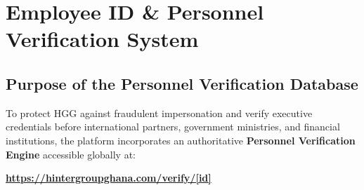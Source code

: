 \documentclass[11pt,a4paper,oneside]{book}
\begin{document}
\chapter{Employee ID \& Personnel Verification System}
\label{chap:verification}

\section{Purpose of the Personnel Verification Database}
To protect HGG against fraudulent impersonation and verify executive credentials before international partners, government ministries, and financial institutions, the platform incorporates an authoritative \textbf{Personnel Verification Engine} accessible globally at:
\begin{center}
  \Large\bfseries\url{https://hintergroupghana.com/verify/[id]}
\end{center}
\end{document}
